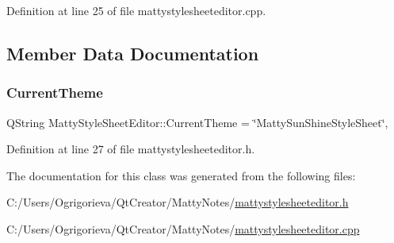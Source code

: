Definition at line 25 of file mattystylesheeteditor.\+cpp.



\subsection{Member Data Documentation}
\hypertarget{classMattyStyleSheetEditor_afcf37fdaf80bc841551e62245c1e0343}{}\label{classMattyStyleSheetEditor_afcf37fdaf80bc841551e62245c1e0343} 
\subsubsection{\texorpdfstring{Current\+Theme}{CurrentTheme}}
{\footnotesize\ttfamily Q\+String Matty\+Style\+Sheet\+Editor\+::\+Current\+Theme = \char`\"{}Matty\+Sun\+Shine\+Style\+Sheet\char`\"{}\hspace{0.3cm}{\ttfamily [static]}, {\ttfamily [private]}}



Definition at line 27 of file mattystylesheeteditor.\+h.



The documentation for this class was generated from the following files\+:\begin{DoxyCompactItemize}
\item 
C\+:/\+Users/\+Ogrigorieva/\+Qt\+Creator/\+Matty\+Notes/\hyperlink{mattystylesheeteditor_8h}{mattystylesheeteditor.\+h}\item 
C\+:/\+Users/\+Ogrigorieva/\+Qt\+Creator/\+Matty\+Notes/\hyperlink{mattystylesheeteditor_8cpp}{mattystylesheeteditor.\+cpp}\end{DoxyCompactItemize}

